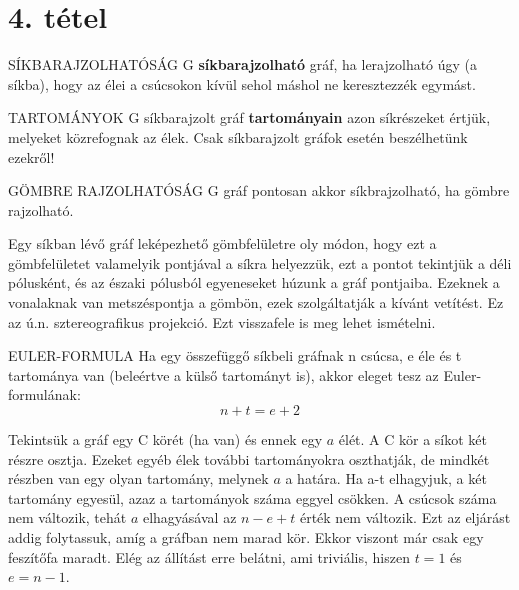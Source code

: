\section{4. tétel}

\begin{definicio}{SÍKBARAJZOLHATÓSÁG}
G \textbf{síkbarajzolható} gráf, ha lerajzolható úgy (a síkba), hogy az élei a csúcsokon kívül sehol máshol ne keresztezzék egymást.
\end{definicio}

\begin{definicio}{TARTOMÁNYOK}
G síkbarajzolt gráf \textbf{tartományain} azon síkrészeket értjük, melyeket közrefognak az élek. Csak síkbarajzolt gráfok esetén beszélhetünk ezekről!
\end{definicio}

\begin{tetel}{GÖMBRE RAJZOLHATÓSÁG}
G gráf pontosan akkor síkbrajzolható, ha gömbre rajzolható.
\end{tetel}

\begin{bizonyitas}{}
Egy síkban lévő gráf leképezhető gömbfelületre oly módon, hogy ezt a gömbfelületet valamelyik pontjával a síkra helyezzük, ezt a pontot tekintjük a déli pólusként, és az északi pólusból egyeneseket húzunk a gráf pontjaiba. Ezeknek a vonalaknak van metszéspontja a gömbön, ezek szolgáltatják a kívánt vetítést. Ez az ú.n. sztereografikus projekció. Ezt visszafele is meg lehet ismételni.
\end{bizonyitas}

\begin{tetel}{EULER-FORMULA}
Ha egy összefüggő síkbeli gráfnak n csúcsa, e éle és t tartománya van (beleértve a külső tartományt is), akkor eleget tesz az Euler-formulának:
$$n + t = e + 2$$
\end{tetel}

\begin{bizonyitas}{}
Tekintsük a gráf egy C körét (ha van) és ennek egy $a$ élét. A C kör a síkot két részre osztja. Ezeket egyéb élek további tartományokra oszthatják, de mindkét részben van egy olyan tartomány, melynek $a$ a határa. Ha a-t elhagyjuk, a két tartomány egyesül, azaz a tartományok száma eggyel csökken. A csúcsok száma nem változik, tehát $a$ elhagyásával az $n - e + t$ érték nem változik. Ezt az eljárást addig folytassuk, amíg a gráfban nem marad kör. Ekkor viszont már csak egy feszítőfa maradt. Elég az állítást erre belátni, ami triviális, hiszen $t = 1$ és $e = n - 1$.
\end{bizonyitas}

